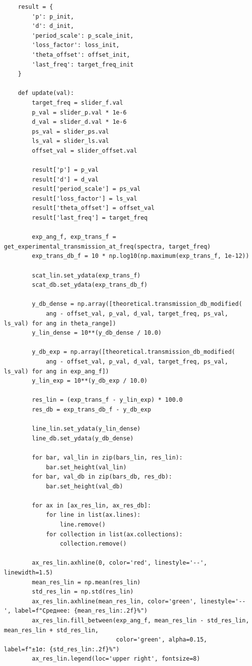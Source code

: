 \begin{verbatim}
    result = {
        'p': p_init,
        'd': d_init,
        'period_scale': p_scale_init,
        'loss_factor': loss_init,
        'theta_offset': offset_init,
        'last_freq': target_freq_init
    }
    
    def update(val):
        target_freq = slider_f.val
        p_val = slider_p.val * 1e-6
        d_val = slider_d.val * 1e-6
        ps_val = slider_ps.val
        ls_val = slider_ls.val
        offset_val = slider_offset.val
        
        result['p'] = p_val
        result['d'] = d_val
        result['period_scale'] = ps_val
        result['loss_factor'] = ls_val
        result['theta_offset'] = offset_val
        result['last_freq'] = target_freq
        
        exp_ang_f, exp_trans_f = get_experimental_transmission_at_freq(spectra, target_freq)
        exp_trans_db_f = 10 * np.log10(np.maximum(exp_trans_f, 1e-12))
        
        scat_lin.set_ydata(exp_trans_f)
        scat_db.set_ydata(exp_trans_db_f)
        
        y_db_dense = np.array([theoretical.transmission_db_modified(
            ang - offset_val, p_val, d_val, target_freq, ps_val, ls_val) for ang in theta_range])
        y_lin_dense = 10**(y_db_dense / 10.0)
        
        y_db_exp = np.array([theoretical.transmission_db_modified(
            ang - offset_val, p_val, d_val, target_freq, ps_val, ls_val) for ang in exp_ang_f])
        y_lin_exp = 10**(y_db_exp / 10.0)
        
        res_lin = (exp_trans_f - y_lin_exp) * 100.0
        res_db = exp_trans_db_f - y_db_exp
        
        line_lin.set_ydata(y_lin_dense)
        line_db.set_ydata(y_db_dense)
        
        for bar, val_lin in zip(bars_lin, res_lin):
            bar.set_height(val_lin)
        for bar, val_db in zip(bars_db, res_db):
            bar.set_height(val_db)
            
        for ax in [ax_res_lin, ax_res_db]:
            for line in list(ax.lines):
                line.remove()
            for collection in list(ax.collections):
                collection.remove()
                
        ax_res_lin.axhline(0, color='red', linestyle='--', linewidth=1.5)
        mean_res_lin = np.mean(res_lin)
        std_res_lin = np.std(res_lin)
        ax_res_lin.axhline(mean_res_lin, color='green', linestyle='--', label=f"Среднее: {mean_res_lin:.2f}%")
        ax_res_lin.fill_between(exp_ang_f, mean_res_lin - std_res_lin, mean_res_lin + std_res_lin,
                                color='green', alpha=0.15, label=f"±1σ: {std_res_lin:.2f}%")
        ax_res_lin.legend(loc='upper right', fontsize=8)
        

\end{verbatim}
